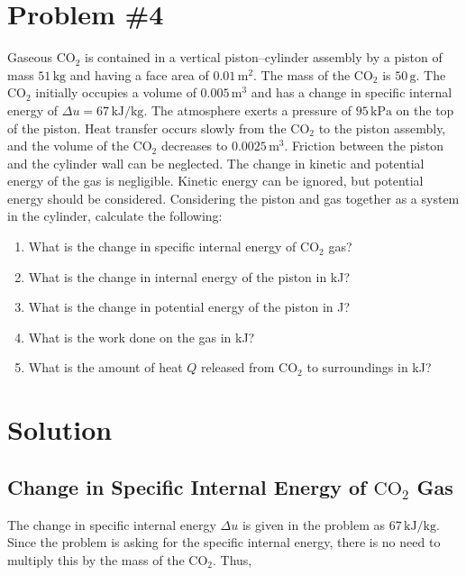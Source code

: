 \documentclass[12pt]{article}
\begin{document}
\newpage
\section*{Problem \#4}
Gaseous \(\text{CO}_2\) is contained in a vertical piston–cylinder assembly by a piston of mass \(51 \, \text{kg}\) and having a face area of \(0.01 \, \text{m}^2\). The mass of the \(\text{CO}_2\) is \(50 \, \text{g}\). The \(\text{CO}_2\) initially occupies a volume of \(0.005 \, \text{m}^3\) and has a change in specific internal energy of \(\Delta u = 67 \, \text{kJ/kg}\). The atmosphere exerts a pressure of \(95 \, \text{kPa}\) on the top of the piston. Heat transfer occurs slowly from the \(\text{CO}_2\) to the piston assembly, and the volume of the \(\text{CO}_2\) decreases to \(0.0025 \, \text{m}^3\). Friction between the piston and the cylinder wall can be neglected. The change in kinetic and potential energy of the gas is negligible. Kinetic energy can be ignored, but potential energy should be considered. Considering the piston and gas together as a system in the cylinder, calculate the following:

\begin{enumerate}
    \item What is the change in specific internal energy of \(\text{CO}_2\) gas?
    \item What is the change in internal energy of the piston in kJ?
    \item What is the change in potential energy of the piston in J?
    \item What is the work done on the gas in kJ?
    \item What is the amount of heat \(Q\) released from \(\text{CO}_2\) to surroundings in kJ?
\end{enumerate}

\section*{Solution}

\subsection*{Change in Specific Internal Energy of \(\text{CO}_2\) Gas}
The change in specific internal energy \(\Delta u\) is given in the problem as \(67 \, \text{kJ/kg}\). Since the problem is asking for the specific internal energy, there is no need to multiply this by the mass of the \(\text{CO}_2\). Thus,
\end{document}
